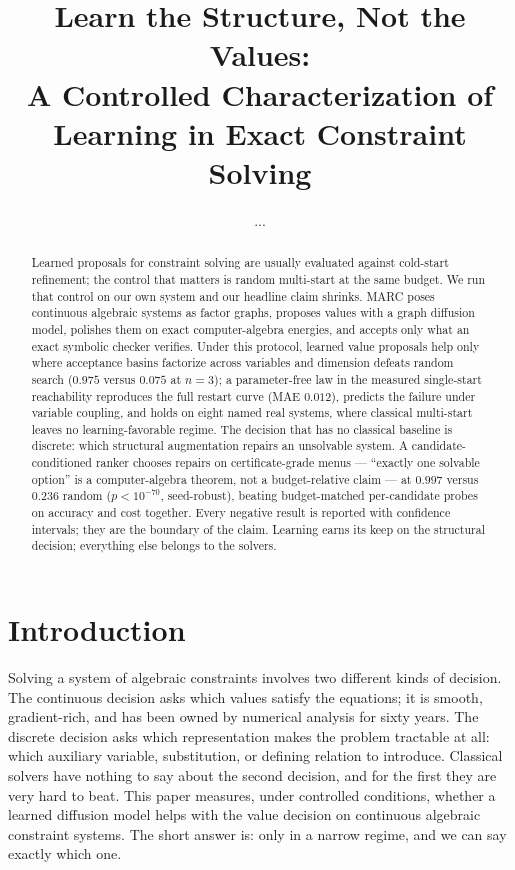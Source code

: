 \documentclass[11pt]{article}
\title{Learn the Structure, Not the Values:\\
A Controlled Characterization of Learning in Exact Constraint Solving}
\author{...}
\date{}
\begin{document}
\maketitle

\begin{abstract}
Learned proposals for constraint solving are usually evaluated against cold-start refinement;
the control that matters is random multi-start at the same budget. We run that control on our
own system and our headline claim shrinks. MARC poses continuous algebraic systems as factor
graphs, proposes values with a graph diffusion model, polishes them on exact computer-algebra
energies, and accepts only what an exact symbolic checker verifies. Under this protocol,
learned value proposals help only where acceptance basins factorize across variables and
dimension defeats random search ($0.975$ versus $0.075$ at $n{=}3$); a parameter-free law in
the measured single-start reachability reproduces the full restart curve (MAE $0.012$),
predicts the failure under variable coupling, and holds on eight named real systems, where
classical multi-start leaves no learning-favorable regime. The decision that has no classical
baseline is discrete: which structural augmentation repairs an unsolvable system. A
candidate-conditioned ranker chooses repairs on certificate-grade menus --- ``exactly one
solvable option'' is a computer-algebra theorem, not a budget-relative claim --- at $0.997$
versus $0.236$ random ($p<10^{-70}$, seed-robust), beating budget-matched per-candidate probes
on accuracy and cost together. Every negative result is reported with confidence intervals;
they are the boundary of the claim. Learning earns its keep on the structural decision;
everything else belongs to the solvers.
\end{abstract}

\section{Introduction}
\label{sec:intro}

Solving a system of algebraic constraints involves two different kinds of decision. The
continuous decision asks which values satisfy the equations; it is smooth, gradient-rich, and
has been owned by numerical analysis for sixty years. The discrete decision asks which
representation makes the problem tractable at all: which auxiliary variable, substitution, or
defining relation to introduce. Classical solvers have nothing to say about the second
decision, and for the first they are very hard to beat. This paper measures, under controlled
conditions, whether a learned diffusion model helps with the value decision on continuous
algebraic constraint systems. The short answer is: only in a narrow regime, and we can say
exactly which one.
\end{document}
